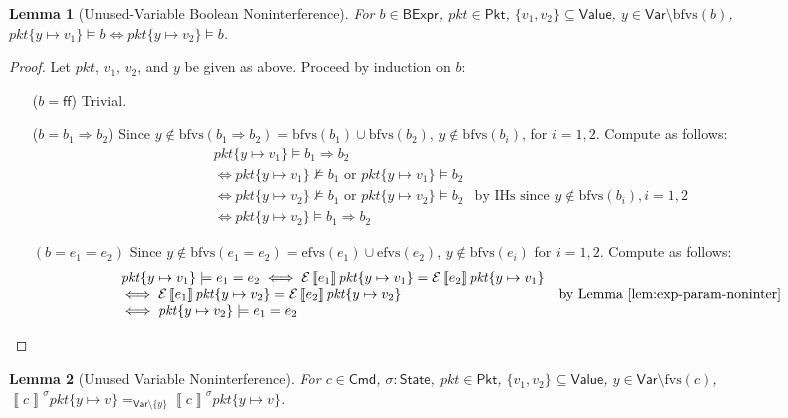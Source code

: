 \documentclass{article}
\newcommand{\pkt}{\mathit{pkt}}
\newcommand{\denote}[1]{\left\llbracket#1\right\rrbracket}
\newcommand{\edenote}[1]{\mathcal{E}\denote{#1}}
\newcommand{\FALSE}{\mathsf{ff}}
\newcommand{\Value}{\mathsf{Value}}
\newcommand{\BExpr}{\mathsf{BExpr}}
\newcommand{\Cmd}{\mathsf{Cmd}}
\newcommand{\Pkt}{\mathsf{Pkt}}
\newcommand{\Var}{\mathsf{Var}}
\newcommand{\State}{\mathsf{State}}
\newcommand{\fvs}{\textrm{fvs}}
\newcommand{\efvs}{\textrm{efvs}}
\newcommand{\bfvs}{\textrm{bfvs}}
\newtheorem{lemma}{Lemma}
\begin{document}
\begin{lemma}[Unused-Variable Boolean Noninterference]
  \label{lem:bool-noninter}
  For $b \in \BExpr$, $\pkt \in \Pkt$,
  $\{v_1,v_2\} \subseteq \Value$, $y \in \Var \setminus \bfvs(b) $,
  $\pkt\{y \mapsto v_1\} \models b \iff pkt\{y \mapsto v_2\} \models b$.
\end{lemma}

\begin{proof}
  Let $\pkt$, $v_1$, $v_2$, and $y$ be given as above.
  Proceed by induction on $b$:
  \begin{enumerate}[align=left]
  \item[($b = \FALSE$)] Trivial.
  \item[($b = b_1 \Rightarrow b_2$)] Since $y \not \in\bfvs(b_1 \Rightarrow b_2) =
    \bfvs(b_1) \cup \bfvs(b_2)$, $y \not \in \bfvs(b_i)$, for $i = 1,2$. Compute
    as follows:
    \[\begin{array}{ll}
    \pkt\{y \mapsto v_1\} \models b_1 \Rightarrow b_2 \\
    \iff \pkt\{y \mapsto v_1\} \not\models b_1 \text{ or } \pkt\{y \mapsto v_1\} \models b_2 \\
    \iff \pkt\{y \mapsto v_2\} \not\models b_1 \text{ or } \pkt\{y \mapsto v_2\} \models b_2
    & \text{by IHs since } y \not \in \bfvs(b_i), i = 1,2 \\
    \iff \pkt\{y \mapsto v_2\} \models b_1 \Rightarrow b_2
    \end{array}\]

  \item[$(b = e_1 = e_2)$] Since $y \not \in\bfvs(e_1 = e_2) = \efvs(e_1) \cup
    \efvs(e_2)$, $y \not \in \bfvs(e_i)$ for $i =1,2$. Compute as follows:
    \[\begin{array}{ll}
    \pkt\{y \mapsto v_1\} \models e_1 = e_2
    \iff \edenote{e_1}\pkt\{y \mapsto v_1\} = \edenote{e_2}\pkt\{y \mapsto v_1\} \\
    \iff\edenote{e_1}\pkt\{y \mapsto v_2\} = \edenote{e_2}\pkt\{y \mapsto v_2\} & \text{by Lemma~\ref{lem:exp-param-noninter}} \\
    \iff \pkt\{y\mapsto v_2\} \models e_1 = e_2
    \end{array}
    \]
  \end{enumerate}
\end{proof}

\begin{lemma}[Unused Variable Noninterference]
  \label{lem:param-noninter}
  For $c \in \Cmd$, $\sigma : \State$, $\pkt \in \Pkt$,
  $\{v_1,v_2\} \subseteq \Value$, $y \in \Var \setminus \fvs(c)$,
  $\denote{c}^\sigma \pkt\{y \mapsto v\} =_{\Var \setminus \{y\}}\denote{c}^\sigma\pkt\{y \mapsto v\}$.
\end{lemma}
\end{document}
